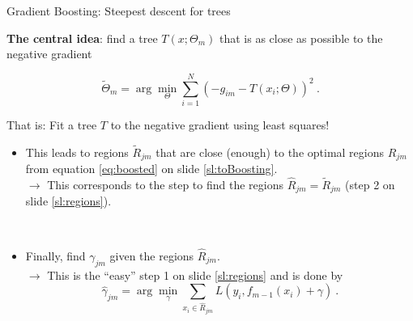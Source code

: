 \documentclass[
  10pt,
  ignorenonframetext,
]{beamer}
\providecommand{\tightlist}{%
  \setlength{\itemsep}{0pt}\setlength{\parskip}{0pt}}
\begin{document}
\begin{frame}
\begin{block}{Gradient Boosting: Steepest descent for trees}
\protect\hypertarget{gradient-boosting-steepest-descent-for-trees}{}
\(~\)

\textbf{The central idea}: find a tree \(T(x;\Theta_m)\) that is as
close as possible to the negative gradient

\begin{equation}
\tilde{\Theta}_m= \arg \min_\Theta \sum_{i=1}^N (-g_{im} -T(x_i;\Theta))^2 \ .
\end{equation}

\vspace{8mm}

That is: Fit a tree \(T\) to the negative gradient using least squares!
\end{block}
\end{frame}

\begin{frame}
\vspace{2mm}

\begin{itemize}
\tightlist
\item
  This leads to regions \(\tilde{R}_{jm}\) that are close (enough) to
  the optimal regions \(R_{jm}\) from equation \eqref{eq:boosted} on
  slide \eqref{sl:toBoosting}.\\
  \vspace{2mm} \(\rightarrow\) This corresponds to the step to find the
  regions \(\hat{R}_{jm}=\tilde{R}_{jm}\) (step 2 on slide
  \ref{sl:regions}).
\end{itemize}

\(~\)

\begin{itemize}
\tightlist
\item
  Finally, find \(\gamma_{jm}\) given the regions \(\hat{R}_{jm}\).\\
  \vspace{2mm} \(\rightarrow\) This is the ``easy'' step 1 on slide
  \ref{sl:regions} and is done by \begin{equation*}
  \hat\gamma_{jm} = \arg \min_{\gamma} \sum_{x_i \in \hat{R}_{jm}} L(y_i, f_{m-1}(x_i) + \gamma) \ .
  \end{equation*}
\end{itemize}
\end{frame}
\end{document}
